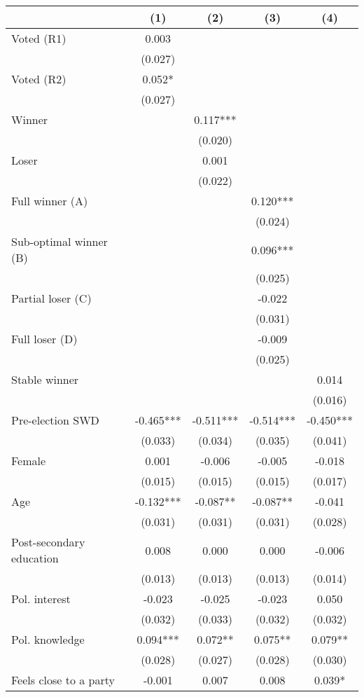 \begin{table}
\centering
\begin{tabular}[t]{lcccc}
\toprule
  & (1) & (2) & (3) & (4)\\
\midrule
Voted (R1) & 0.003 &  &  & \\
 & (0.027) &  &  \vphantom{1} & \\
Voted (R2) & 0.052* &  &  & \\
 & (0.027) &  &  & \\
Winner &  & 0.117*** &  & \\
 &  & (0.020) &  & \\
Loser &  & 0.001 &  & \\
 &  & (0.022) &  & \\
Full winner (A) &  &  & 0.120*** & \\
 &  &  & (0.024) & \\
Sub-optimal winner (B) &  &  & 0.096*** & \\
 &  &  & (0.025) \vphantom{1} & \\
Partial loser (C) &  &  & -0.022 & \\
 &  &  & (0.031) & \\
Full loser (D) &  &  & -0.009 & \\
 &  &  & (0.025) & \\
Stable winner &  &  &  & 0.014\\
 &  &  &  & (0.016)\\
Pre-election SWD & -0.465*** & -0.511*** & -0.514*** & -0.450***\\
 & (0.033) & (0.034) & (0.035) & (0.041)\\
Female & 0.001 & -0.006 & -0.005 & -0.018\\
 & (0.015) & (0.015) & (0.015) & (0.017)\\
Age & -0.132*** & -0.087** & -0.087** & -0.041\\
 & (0.031) & (0.031) & (0.031) & (0.028)\\
Post-secondary education & 0.008 & 0.000 & 0.000 & -0.006\\
 & (0.013) & (0.013) & (0.013) & (0.014)\\
Pol. interest & -0.023 & -0.025 & -0.023 & 0.050\\
 & (0.032) & (0.033) & (0.032) & (0.032)\\
Pol. knowledge & 0.094*** & 0.072** & 0.075** & 0.079**\\
 & (0.028) & (0.027) & (0.028) & (0.030)\\
Feels close to a party & -0.001 & 0.007 & 0.008 & 0.039*\\

\end{tabular}
\end{table}
